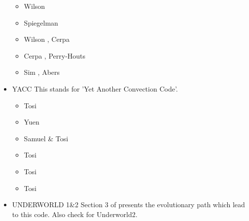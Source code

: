 \begin{itemize}
\begin{scriptsize}
\begin{itemize}
\item[\twothousandfourteen] Wilson \etal \cite{wisv14}
\item[\twothousandsixteen] Spiegelman \cite{spmw16}
\item[\twothousandseventeen] Wilson \etal \cite{wisv17}, Cerpa \etal \cite{ceww17}
\item[\twothousandnineteen] Cerpa \etal \cite{ceww19}, Perry-Houts \cite{perr19}
\item[\twothousandtwenty] Sim \etal \cite{siss20}, Abers \etal \cite{abvw20}
\end{itemize}
\end{scriptsize}

\item {\codefont YACC} 
This stands for 'Yet Another Convection Code'.

\begin{scriptsize}
\begin{itemize}
\item[\twothousandten] Tosi \etal \cite{toyc10}
\item[\twothousandeleven] Yuen \etal \cite{yutc11}
\item[\twothousandtwelve] Samuel \& Tosi \cite{sato12}
\item[\twothousandthirteen] Tosi \etal \cite{toyd13}
\item[\twothousandfifteen] Tosi \etal \cite{tosn15}
\item[\twothousandsixteen] Tosi \etal \cite{tomy16}
\end{itemize}
\end{scriptsize}

\item {\codefont UNDERWORLD 1\&2} 
Section 3 of \cite{qums07} presents the evolutionary path which lead to this code.
Also check \cite{magm20} for Underworld2. 


\end{itemize}
